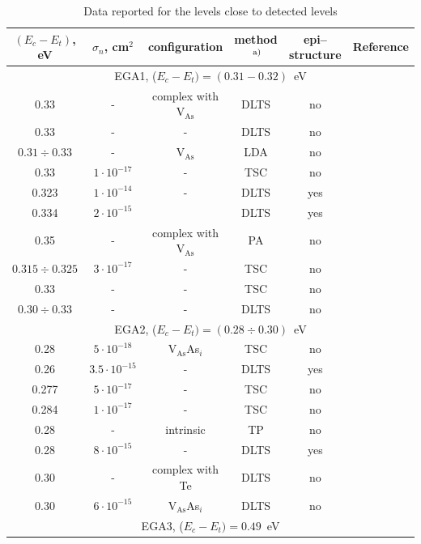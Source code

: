 \documentclass[final,3p,times,twocolumn,authoryear]{elsarticle}
\begin{document}
\begin{table}
\caption{\label{tabEGA1}Data reported for the levels close to detected levels
}
\center
\renewcommand{\arraystretch}{0.65}
\begin{tabular}{cccccc}
\hline
$(E_c-E_t)$, eV &$\sigma_n$, cm$^2$&configuration&method$\textsuperscript{ a)}$&epi--structure&Reference\\
\hline
\multicolumn{6}{c}{EGA1, ($E_c-E_t)=(0.31-0.32)$~eV}\\
0.33&-&complex with V$_\mathrm{As}$&DLTS&no&\cite{EL6:Richter}\\%
0.33&-&-&DLTS&no&\cite{Neild1991}\\ %
$0.31\div0.33$&-&V$_\mathrm{As}$&LDA&no&\cite{EL6:Schultz}\\ %
0.33&$1\cdot10^{-17}$&-&TSC&no&\cite{Pavlovic2000}\\ %
0.323&$1\cdot10^{-14}$&-&DLTS&yes&\cite{Yousefi1995}\\ %
0.334&$2\cdot10^{-15}$&&DLTS&yes&\cite{Yousefi1995}\\ %
0.35&-&complex with V$_\mathrm{As}$&PA&no&\cite{EL6:Kuisma}\\ %
$0.315\div0.325$&$3\cdot10^{-17}$&-&TSC&no&\cite{Pavlovic:GaAs}\\ %
0.33&-&-&TSC&no&\cite{Tomozane:GaAs}\\ %
$0.30\div0.33$&-&-&DLTS&no&\cite{Lang:GaAs}\\ %
\multicolumn{6}{c}{EGA2, ($E_c-E_t)=(0.28\div0.30)$~eV}\\
0.28&$5\cdot10^{-18}$&V$_\mathrm{As}$As$_i$&TSC&no&\cite{Pavlovic2000}\\ %
0.26&$3.5\cdot10^{-15}$&-&DLTS&yes&\cite{Yousefi1995}\\ %
0.277&$5\cdot10^{-17}$&-&TSC&no&\cite{Pavlovic:GaAs}\\ %
0.284&$1\cdot10^{-17}$&-&TSC&no&\cite{Pavlovic:GaAs}\\ %
0.28&-&intrinsic&TP&no&\cite{Abele:GaAs}\\ %
0.28&$8\cdot10^{-15}$&-&DLTS&yes&\cite{Mircea1975}\\ %
0.30&-&complex with Te&DLTS&no&\cite{KolFTP1994En}\\ %
0.30&$6\cdot10^{-15}$&V$_\mathrm{As}$As$_i$&DLTS&no&\cite{Pons}\\ %
\multicolumn{6}{c}{EGA3, ($E_c-E_t)=0.49$~eV}\\

\end{tabular}
\end{table}
\end{document}

